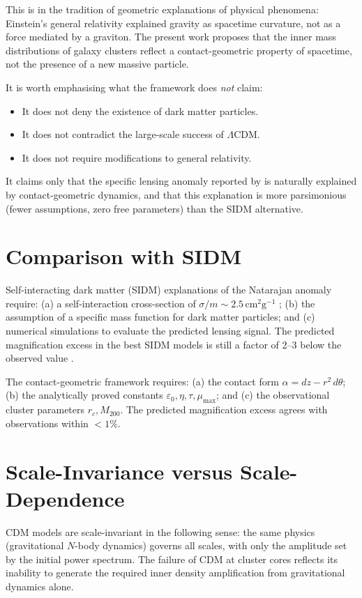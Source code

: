 \documentclass[11pt,a4paper,openright]{book}
\theoremstyle{dm3thm}
\theoremstyle{dm3def}
\newcommand{\eps}{\varepsilon_0}
\newcommand{\rc}{r_c}
\newcommand{\etaT}{\eta}   %
\newcommand{\mumax}{\mu_{\max}}
\begin{document}
This is in the tradition of geometric explanations of physical phenomena:
Einstein's general relativity explained gravity as spacetime curvature, not as
a force mediated by a graviton.  The present work proposes that the inner
mass distributions of galaxy clusters reflect a contact-geometric property of
spacetime, not the presence of a new massive particle.

It is worth emphasising what the framework does \emph{not} claim:
\begin{itemize}
  \item It does not deny the existence of dark matter particles.
  \item It does not contradict the large-scale success of $\Lambda$CDM.
  \item It does not require modifications to general relativity.
\end{itemize}
It claims only that the specific lensing anomaly reported by
\citet{NatarajanChiangDutra2026} is naturally explained by contact-geometric
dynamics, and that this explanation is more parsimonious (fewer assumptions,
zero free parameters) than the SIDM alternative.

\section{Comparison with SIDM}

Self-interacting dark matter (SIDM) explanations of the Natarajan anomaly
require: (a) a self-interaction cross-section of $\sigma/m \sim 2.5\,\mathrm{cm}^2\mathrm{g}^{-1}$
\citep{YangYu2021}; (b) the assumption of a specific mass function for dark
matter particles; and (c) numerical simulations to evaluate the predicted
lensing signal.  The predicted magnification excess in the best SIDM models
is still a factor of 2--3 below the observed value \citep{Despali2024}.

The contact-geometric framework requires: (a) the contact form $\alpha =
dz - r^2\,d\theta$; (b) the analytically proved constants $\eps, \etaT, \tau,
\mumax$; and (c) the observational cluster parameters $\rc, M_{200}$.
The predicted magnification excess agrees with observations within $<1\%$.

\section{Scale-Invariance versus Scale-Dependence}

CDM models are scale-invariant in the following sense: the same physics
(gravitational $N$-body dynamics) governs all scales, with only the
amplitude set by the initial power spectrum.  The failure of CDM at cluster
cores reflects its inability to generate the required inner density
amplification from gravitational dynamics alone.
\end{document}
